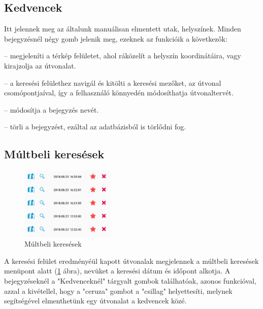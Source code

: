 \subsection{Kedvencek}
 
 Itt jelennek meg az általunk manuálisan elmentett utak, helyszínek. Minden bejegyzésnél négy gomb jelenik meg, ezeknek az funkcióik a következők:
 
 \begin{description}
 	\setlength{\itemsep}{0.04mm}
 	\item[térkép] -- megjeleníti a térkép felületet, ahol ráközelít a helyszín koordinátáira, vagy kirajzolja az útvonalat.
 	\item[nagyító] -- a keresési felülethez navigál és kitölti a keresési mezőket, az útvonal csomópontjaíval, így a felhasználó könnyedén módosíthatja útvonaltervét.
 	\item[ceruza] -- módosítja a bejegyzés nevét.
 	\item[X] -- törli a bejegyzést, ezáltal az adatbázisból is törlődni fog.
 \end{description}

\subsection{Múltbeli keresések}

\begin{figure}
	\centering
	\setlength{\abovecaptionskip}{0pt}
	\setlength{\belowcaptionskip}{-30pt}
	\includegraphics[width=0.4\textwidth]{images/history}
	\caption{Múltbeli keresések\label{fig:history}}
\end{figure}

A keresési felület eredményéül kapott útvonalak megjelennek a múltbeli keresések menüpont alatt (\ref{fig:history} ábra), nevüket a keresési dátum és időpont alkotja. A bejegyzéseknél a "Kedvenceknél" tárgyalt gombok találhatóak, azonos funkcióval, azzal a kivétellel, hogy a "ceruza" gombot a "csillag" helyettesíti, melynek segítségével elmenthetünk egy útvonalat a kedvencek közé.

